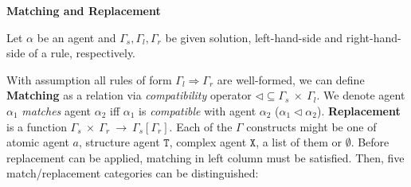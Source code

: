 \documentclass[12pt]{article}
\newcommand{\mysection}[1]{{\newpage\centering\Large\textbf{#1}\\}\normalsize\vspace{0.5cm}}
\begin{document}
\mysection{Matching and Replacement}

Let $\alpha$ be an agent and $\Gamma_s, \Gamma_l, \Gamma_r$ be given solution, left-hand-side and right-hand-side of a rule, respectively.

With assumption all rules of form $\Gamma_l\Rightarrow\Gamma_r$ are well-formed, we can define \textbf{Matching} as a relation via \textit{compatibility} operator $\lhd \subseteq \Gamma_s~\times~\Gamma_l $. We denote agent $\alpha_1$ \textit{matches} agent $\alpha_2$ iff $\alpha_1$ is \textit{compatible} with agent $\alpha_2$ ($\alpha_1 \lhd \alpha_2$).
\textbf{Replacement} is a function $\Gamma_s~\times~\Gamma_r~\rightarrow~\Gamma_s[\Gamma_r]$. Each of the $\Gamma$ constructs might be one of atomic agent $a$, structure agent $\mathtt{T}$, complex agent $\mathtt{X}$, a list of them or $\emptyset$. Before replacement can be applied, matching in left column must be satisfied. Then, five match/replacement categories can be distinguished:
\end{document}
